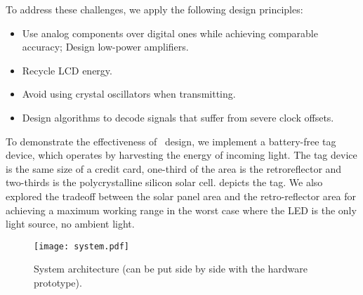 
To address these challenges, we apply the following design principles:

\begin{itemize}
\item Use analog components over digital ones while achieving comparable accuracy; Design low-power amplifiers.
\item Recycle LCD energy. 
\item Avoid using crystal oscillators when transmitting.
\item Design algorithms to decode signals that suffer from severe clock offsets.
\end{itemize}


To demonstrate the effectiveness of \retro\ design, we implement a battery-free tag device, which operates by harvesting the energy of incoming light. The tag device is the same size of a credit card, one-third of the area is the retroreflector and two-thirds is the polycrystalline silicon solar cell. %
 depicts the tag.
We also explored the tradeoff between the solar panel area and the retro-reflector area for achieving a maximum working range in the worst case where the LED is the only light source, \ie no ambient light. %
\begin{figure}[th]
   \centering
   \texttt{[image: system.pdf]}
   \caption{System architecture (can be put side by side with the hardware prototype).}
   \label{fig:system}
   \vskip -3mm
\end{figure}

